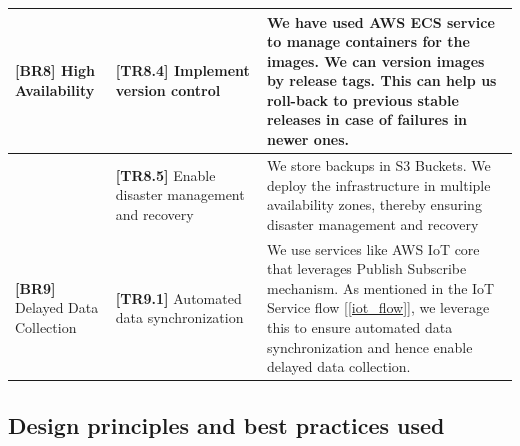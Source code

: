 \documentclass{article}
\begin{document}
\begin{table}[H]
\begin{tabular}{|p{0.2\linewidth}| p{0.3\linewidth} | p{0.5\linewidth} |}

         \textbf{[BR8]} High Availability &  \textbf{[TR8.4]} Implement version control & We have used AWS ECS service to manage containers for the images. We can version images by release tags. This can help us roll-back to previous stable releases in case of failures in newer ones. \\ \hline
         &  \textbf{[TR8.5]} Enable disaster management and recovery & We store backups in S3 Buckets. We deploy the infrastructure in multiple availability zones, thereby ensuring disaster management and recovery\\ \hline
         \textbf{[BR9]} Delayed Data Collection&  \textbf{[TR9.1]} Automated data synchronization& We use services like AWS IoT core that leverages Publish Subscribe mechanism. As mentioned in the IoT Service flow [\ref{iot_flow}], we leverage this to ensure automated data synchronization and hence enable delayed data collection. \\ \hline
    \end{tabular}
\end{table}

\newpage
\subsection{Design principles and best practices used}
\end{document}
